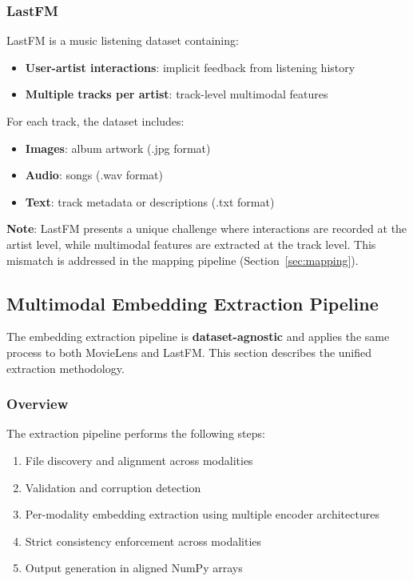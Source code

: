 \subsubsection{LastFM}

LastFM is a music listening dataset containing:
\begin{itemize}
    \item \textbf{User-artist interactions}: implicit feedback from listening history
    \item \textbf{Multiple tracks per artist}: track-level multimodal features
\end{itemize}

For each track, the dataset includes:
\begin{itemize}
    \item \textbf{Images}: album artwork (.jpg format)
    \item \textbf{Audio}: songs (.wav format)
    \item \textbf{Text}: track metadata or descriptions (.txt format)
\end{itemize}

\textbf{Note}: LastFM presents a unique challenge where interactions are recorded at the artist level, while multimodal features are extracted at the track level. This mismatch is addressed in the mapping pipeline (Section~\ref{sec:mapping}).

\subsection{Multimodal Embedding Extraction Pipeline}
\label{sec:extraction}

The embedding extraction pipeline is \textbf{dataset-agnostic} and applies the same process to both MovieLens and LastFM. This section describes the unified extraction methodology.

\subsubsection{Overview}

The extraction pipeline performs the following steps:
\begin{enumerate}
    \item File discovery and alignment across modalities
    \item Validation and corruption detection
    \item Per-modality embedding extraction using multiple encoder architectures
    \item Strict consistency enforcement across modalities
    \item Output generation in aligned NumPy arrays
\end{enumerate}

